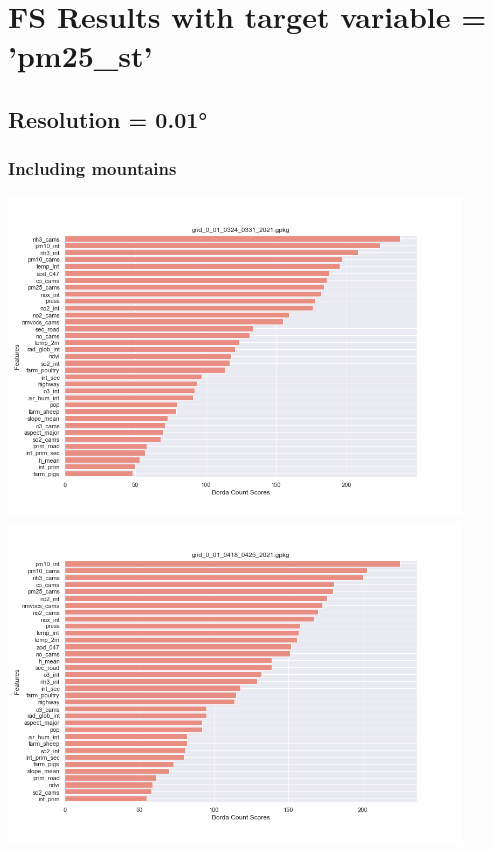 \section{FS Results with target variable = 'pm25\_st'}
\label{sec:pm25}
\subsection{Resolution = 0.01°}
\subsubsection{Including mountains}
\begin{center}
\includegraphics[width=0.9\textwidth]{images/fs_results/pm25/001/montains/grid_0_01_0324_0331_2021.png}
\includegraphics[width=0.9\textwidth]{images/fs_results/pm25/001/montains/grid_0_01_0418_0425_2021.png}

\end{center}
